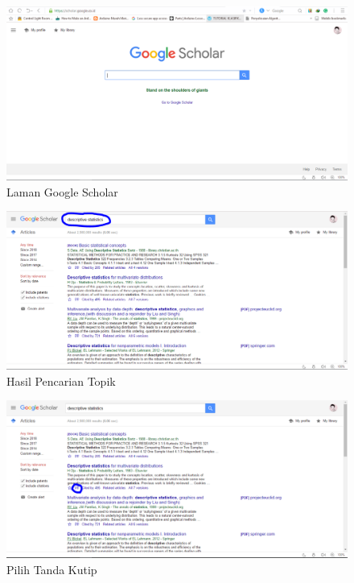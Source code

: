 \begin{figure}[ht]
        \centerline{\includegraphics[width=1\textwidth]{figures/lamanscholar}}
        \caption{Laman Google Scholar}
		\label{gsutama}
\end{figure}

\begin{figure}[ht]
       \centerline{\includegraphics[width=1\textwidth]{figures/pencarianscholar}}
       \caption{Hasil Pencarian Topik}
		\label{caritopik}
\end{figure}

\begin{figure}[ht]
        \centerline{\includegraphics[width=1\textwidth]{figures/pilihtandakutip}}
        \caption{Pilih Tanda Kutip}
		\label{pilihtandakutip}
\end{figure}

